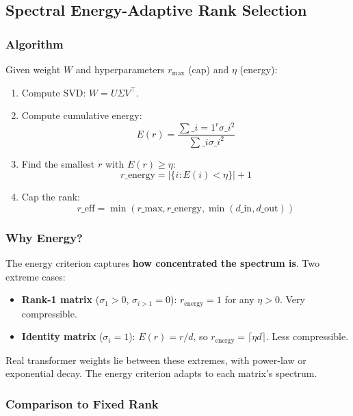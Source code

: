 \subsection{Spectral Energy-Adaptive Rank Selection}

\subsubsection{Algorithm}

Given weight $W$ and hyperparameters $r_\text{max}$ (cap) and $\eta$ (energy):

\begin{enumerate}
\item Compute SVD: $W = U \Sigma V^\top$.
\item Compute cumulative energy:
  $$
  E(r) = \frac{\sum\_{i=1}^{r} \sigma\_i^2}{\sum\_i \sigma\_i^2}
  \tag{4.3}
  $$
\item Find the smallest $r$ with $E(r) \geq \eta$:
  $$
  r\_\text{energy} = \left|\{i : E(i) < \eta\}\right| + 1
  \tag{4.4}
  $$
\item Cap the rank:
  $$
  r\_\text{eff} = \min(r\_\text{max}, r\_\text{energy}, \min(d\_\text{in}, d\_\text{out}))
  \tag{4.5}
  $$

\end{enumerate}
\subsubsection{Why Energy?}

The energy criterion captures \textbf{how concentrated the spectrum is}. Two 
extreme cases:

\begin{itemize}
\item \textbf{Rank-1 matrix} ($\sigma_1 > 0$, $\sigma_{i>1} = 0$): $r_\text{energy} = 1$
  for any $\eta > 0$. Very compressible.
\item \textbf{Identity matrix} ($\sigma_i = 1$): $E(r) = r / d$, so
  $r_\text{energy} = \lceil \eta d \rceil$. Less compressible.

\end{itemize}
Real transformer weights lie between these extremes, with power-law or 
exponential decay. The energy criterion adapts to each matrix's spectrum.

\subsubsection{Comparison to Fixed Rank}

